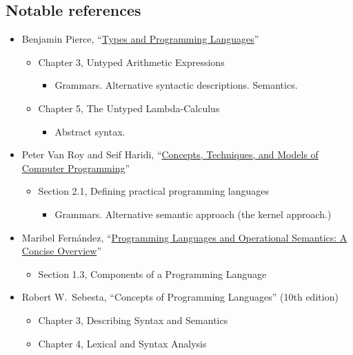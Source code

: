 \documentclass[11pt]{article}
\theoremstyle{definition}
\begin{document}
\subsection{Notable references}
\label{sec:org1c87796}
\begin{itemize}
\item Benjamin Pierce,
“\href{https://ebookcentral.proquest.com/lib/mcmu/detail.action?docID=3338823}{Types and Programming Languages}”
\begin{itemize}
\item Chapter 3, Untyped Arithmetic Expressions
\begin{itemize}
\item Grammars. Alternative syntactic descriptions. Semantics.
\end{itemize}
\item Chapter 5, The Untyped Lambda-Calculus
\begin{itemize}
\item Abstract syntax.
\end{itemize}
\end{itemize}

\item Peter Van Roy and Seif Haridi,
“\href{http://citeseerx.ist.psu.edu/viewdoc/download?doi=10.1.1.102.7366\&rep=rep1\&type=pdf}{Concepts, Techniques, and Models of Computer Programming}”
\begin{itemize}
\item Section 2.1, Defining practical programming languages
\begin{itemize}
\item Grammars. Alternative semantic approach (the kernel approach.)
\end{itemize}
\end{itemize}

\item Maribel Fernández,
“\href{https://discovery.mcmaster.ca/iii/encore/record/C\_\_Rb2200622?lang=eng}{Programming Languages and Operational Semantics: A Concise Overview}” 
\begin{itemize}
\item Section 1.3, Components of a Programming Language
\end{itemize}

\item Robert W. Sebesta, “Concepts of Programming Languages” (10th edition)
\begin{itemize}
\item Chapter 3, Describing Syntax and Semantics
\item Chapter 4, Lexical and Syntax Analysis
\end{itemize}
\end{itemize}
\end{document}
